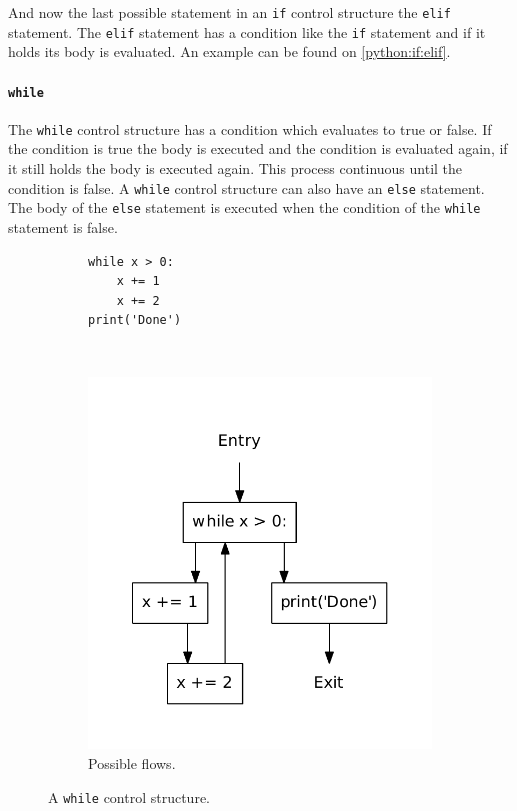 And now the last possible statement in an \texttt{if} control structure the \texttt{elif} statement.
The \texttt{elif} statement has a condition like the \texttt{if} statement and if it holds its body is evaluated.
An example can be found on \cref{python:if:elif}.


\paragraph{\texttt{while}}
The \texttt{while} control structure has a condition which evaluates to true or false.
If the condition is true the body is executed and the condition is evaluated again, if it still holds the body is executed again.
This process continuous until the condition is false.
A \texttt{while} control structure can also have an \texttt{else} statement.
The body of the \texttt{else} statement is executed when the condition of the \texttt{while} statement is false.

\begin{figure}
  \centering
  \begin{subfigure}[b]{0.4\textwidth}
    \begin{lstlisting}[style=python, caption={Code example.}, label={python:while:code}]
while x > 0:
    x += 1
    x += 2
print('Done')
    \end{lstlisting}
  \end{subfigure}
  ~ %
  \begin{subfigure}[b]{0.4\textwidth}
    \centering
    \includegraphics[scale=.5]{./figures/while_no_orelse.pdf}
    \caption{Possible flows.}
    \label{python:while:flow}
  \end{subfigure}
  \caption{A \texttt{while} control structure.}
  \label{python:while}
\end{figure}

